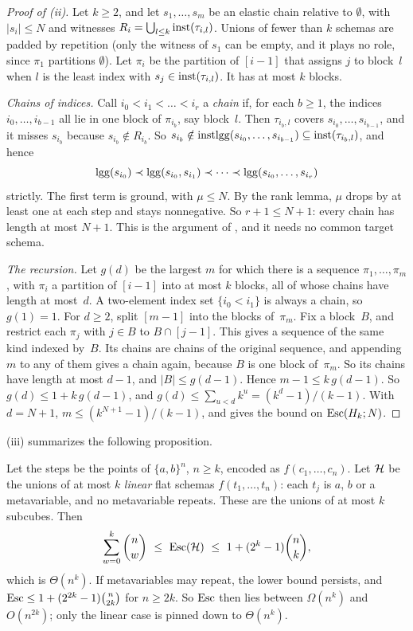 \begin{proof}[Proof of (ii)]
Let $k\ge2$, and let $s_1,\dots,s_m$ be an elastic chain relative to $\emptyset$, with $|s_i|\le N$ and witnesses $R_i=\bigcup_{l\le k}\mathrm{inst}(\tau_{i,l})$. Unions of fewer than $k$ schemas are padded by repetition (only the witness of $s_1$ can be empty, and it plays no role, since $\pi_1$ partitions $\emptyset$). Let $\pi_i$ be the partition of $[i-1]$ that assigns $j$ to block~$l$ when $l$ is the least index with $s_j\in\mathrm{inst}(\tau_{i,l})$. It has at most $k$ blocks.

\emph{Chains of indices.} Call $i_0<i_1<\dots<i_r$ a \emph{chain} if, for each $b\ge1$, the indices $i_0,\dots,i_{b-1}$ all lie in one block of $\pi_{i_b}$, say block~$l$. Then $\tau_{i_b,l}$ covers $s_{i_0},\dots,s_{i_{b-1}}$, and it misses $s_{i_b}$ because $s_{i_b}\notin R_{i_b}$. So $s_{i_b}\notin\mathrm{inst}\mathrm{lgg}(s_{i_0},\dots,s_{i_{b-1}})\subseteq\mathrm{inst}(\tau_{i_b,l})$, and hence
\[
\mathrm{lgg}(s_{i_0})\prec\mathrm{lgg}(s_{i_0},s_{i_1})\prec\dots\prec\mathrm{lgg}(s_{i_0},\dots,s_{i_r})
\]
strictly. The first term is ground, with $\mu\le N$. By the rank lemma, $\mu$ drops by at least one at each step and stays nonnegative. So $r+1\le N+1$: every chain has length at most $N+1$. This is the argument of , and it needs no common target schema.

\emph{The recursion.} Let $g(d)$ be the largest $m$ for which there is a sequence $\pi_1,\dots,\pi_m$, with $\pi_i$ a partition of $[i-1]$ into at most $k$ blocks, all of whose chains have length at most~$d$. A two-element index set $\{i_0<i_1\}$ is always a chain, so $g(1)=1$. For $d\ge2$, split $[m-1]$ into the blocks of~$\pi_m$. Fix a block~$B$, and restrict each $\pi_j$ with $j\in B$ to $B\cap[j-1]$. This gives a sequence of the same kind indexed by~$B$. Its chains are chains of the original sequence, and appending~$m$ to any of them gives a chain again, because $B$ is one block of~$\pi_m$. So its chains have length at most $d-1$, and $|B|\le g(d-1)$. Hence $m-1\le k\,g(d-1)$. So $g(d)\le1+k\,g(d-1)$, and $g(d)\le\sum_{u<d}k^u=(k^d-1)/(k-1)$. With $d=N+1$, $m\le(k^{N+1}-1)/(k-1)$, and  gives the bound on $\mathrm{Esc}(H_k;N)$.
\end{proof}

(iii) summarizes the following proposition.

\begin{proposition}\label{prop:app:caution:flat}
Let the steps be the points of $\{a,b\}^n$, $n\ge k$, encoded as $f(c_1,\dots,c_n)$. Let $\mathcal{H}$ be the unions of at most $k$ \emph{linear} flat schemas $f(t_1,\dots,t_n)$: each $t_j$ is $a$, $b$ or a metavariable, and no metavariable repeats. These are the unions of at most $k$ subcubes. Then
\[
\sum_{w=0}^k\binom nw\ \le\ \Esc(\Hc)\ \le\ 1+(2^k-1)\binom nk ,
\]
which is $\Theta(n^k)$. If metavariables may repeat, the lower bound persists, and $\mathrm{Esc}\le1+(2^{2k}-1)\binom n{2k}$ for $n\ge2k$. So $\mathrm{Esc}$ then lies between $\Omega(n^k)$ and $O(n^{2k})$; only the linear case is pinned down to $\Theta(n^k)$.
\end{proposition}

